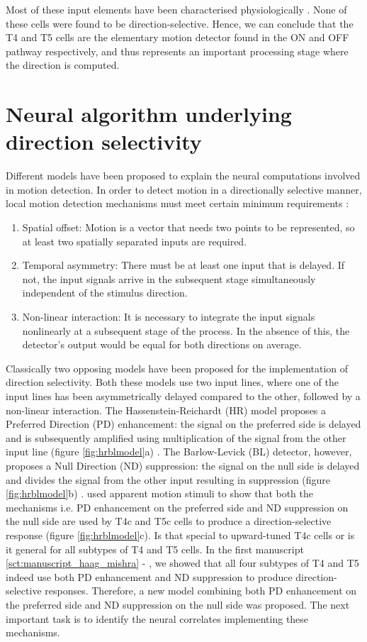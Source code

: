 Most of these input elements have been characterised physiologically \parencite{Arenz2017, Serbe2016, Strother2017, Meier2019, Behnia2014, Groschner2022}. None of these cells were found to be direction-selective. Hence, we can conclude that the T4 and T5 cells are the elementary motion detector found in the ON and OFF pathway respectively, and thus represents an important processing stage where the direction is computed.    

\section{Neural algorithm underlying direction selectivity}
Different models have been proposed to explain the neural computations involved in motion detection. In order to detect motion in a directionally selective manner, local motion detection mechanisms must meet certain minimum requirements \parencite{Borst1989}:
\begin{enumerate}
\item Spatial offset: Motion is a vector that needs two points to be represented, so at least two spatially separated inputs are required.
\item Temporal asymmetry: There must be at least one input that is delayed. If not, the input signals arrive in the subsequent stage simultaneously independent of the stimulus direction.
\item Non-linear interaction: It is necessary to integrate the input signals nonlinearly at a subsequent stage of the process. In the absence of this, the detector's output would be equal for both directions on average.
\end{enumerate} 

Classically two opposing models have been proposed for the implementation of direction selectivity. Both these models use two input lines, where one of the input lines has been asymmetrically delayed compared to the other, followed by a non-linear interaction. The Hassenstein-Reichardt (HR) model proposes a Preferred Direction (PD) enhancement: the signal on the preferred side is delayed and is subsequently amplified using multiplication of the signal from the other input line (figure \ref{fig:hrblmodel}a) \parencite{Hassenstein1956}. The Barlow-Levick (BL) detector, however, proposes a Null Direction (ND) suppression: the signal on the null side is delayed and divides the signal from the other input resulting in suppression (figure \ref{fig:hrblmodel}b) \parencite{Barlow1965}. \cite{Haag2016} used apparent motion stimuli to show that both the mechanisms i.e. PD enhancement on the preferred side and ND suppression on the null side are used by T4c and T5c cells to produce a direction-selective response (figure \ref{fig:hrblmodel}c). Is that special to upward-tuned T4c cells or is it general for all subtypes of T4 and T5 cells. In the first manuscript \ref{sct:manuscript_haag_mishra} - \parencite{Haag2017}, we showed that all four subtypes of T4 and T5 indeed use both PD enhancement and ND suppression to produce direction-selective responses. Therefore, a new model combining both PD enhancement on the preferred side and ND suppression on the null side was proposed. The next important task is to identify the neural correlates implementing these mechanisms. 

